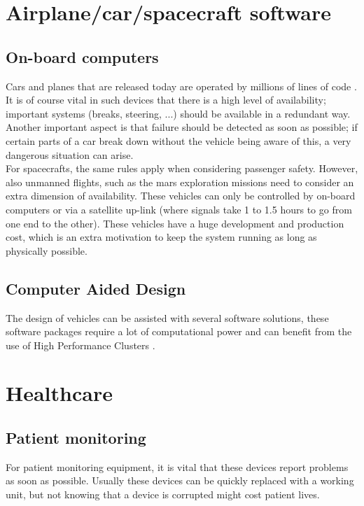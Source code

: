 \documentclass[12pt]{report}
\begin{document}
\section{Airplane/car/spacecraft software}
\subsection{On-board computers}
Cars and planes that are released today are operated by millions of lines of code
\cite{ieee_cars_and_planes}. It is of course vital in such devices
that there is a high level of availability; important systems (breaks,
steering, ...) should be available in a redundant way. \\
Another important aspect is that failure should be detected as soon as
possible; if certain parts of a car break down without the vehicle being aware of this, a very dangerous
situation can arise.\\
For spacecrafts, the same rules apply when considering passenger
safety. However, also unmanned flights, such as the mars exploration missions
need to consider an extra dimension of availability. These vehicles
can only be controlled by on-board computers or via a satellite
up-link (where signals take 1 to 1.5 hours \cite{mars_rover} to go
from one end to the other). These vehicles have a
huge development and production cost, which is an extra motivation to
 keep the system running as long as physically possible.
\subsection{Computer Aided Design}
The design of vehicles can be assisted with several software
solutions, these software packages require a lot of computational
power and can benefit from the use of High Performance Clusters
\cite{hpc_cars}.

\section{Healthcare}
\subsection{Patient monitoring}
For patient monitoring equipment, it is vital that these devices
report problems as soon as possible. Usually these devices can be
quickly replaced with a working unit, but not knowing that a device is
corrupted might cost patient lives.\\
\end{document}
